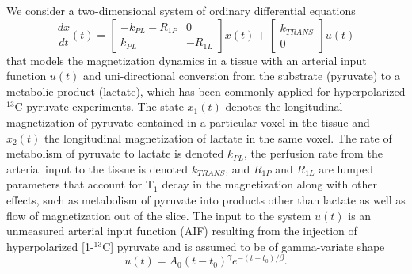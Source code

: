 \documentclass{article}
\begin{document}
We consider a two-dimensional system of ordinary differential equations 
\begin{equation}
  \displaystyle \frac{dx}{dt}(t) =  \left[ \begin{array}{cc}
   -k_{PL} - R_{1P} & 0 \\ 
    k_{PL} & -R_{1L} \end{array} \right] x(t) +  \left[ \begin{array}{c} k_{TRANS} \\ 0 \end{array} \right] u(t)
  \label{eq:ct}
\end{equation}
that models the magnetization dynamics in a tissue with an arterial input function $u(t)$ and uni-directional conversion from the substrate (pyruvate) to a metabolic product (lactate), which has been commonly applied for hyperpolarized $^{13}$C pyruvate experiments. The state $x_1(t)$ denotes the longitudinal magnetization of pyruvate contained in a particular voxel in the tissue and $x_2(t)$ the longitudinal magnetization of lactate in the same voxel. The rate of metabolism of pyruvate to lactate is denoted $k_{PL}$, the perfusion rate from the arterial input to the tissue is denoted $k_{TRANS}$, and $R_{1P}$ and $R_{1L}$ are lumped parameters that account for T$_1$ decay in the magnetization along with other effects, such as metabolism of pyruvate into products other than lactate as well as flow of magnetization out of the slice. The input to the system $u(t)$ is an unmeasured arterial input function (AIF) resulting from the injection of hyperpolarized [1-$^{13}$C] pyruvate and is assumed to be of gamma-variate shape
 \[
   u(t) = A_0 (t - t_0)^\gamma e^{-(t -t_0)/\beta}. 
 \]
 
\end{document}

